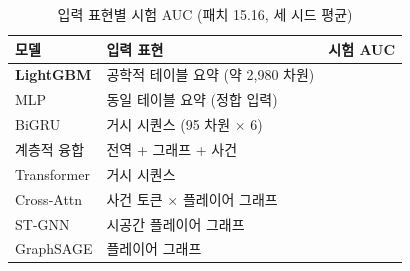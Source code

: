\begin{table}[htbp]
  \centering
  \caption{입력 표현별 시험 AUC (패치 15.16, 세 시드 평균)}
  \label{tab:baseline}
  \small
  \begin{tabular}{@{}llc@{}}
    \toprule
    모델 & 입력 표현 & 시험 AUC \\
    \midrule
    \textbf{LightGBM} & 공학적 테이블 요약 (약 2{,}980 차원) & \textbf{\aucLGBM{}} \\
    MLP & 동일 테이블 요약 (정합 입력) & \aucMLP{} \\
    BiGRU & 거시 시퀀스 (95 차원 $\times$ 6) & \aucBiGRU{} \\
    계층적 융합 & 전역 + 그래프 + 사건 & \aucLayered{} \\
    Transformer & 거시 시퀀스 & \aucTransformer{} \\
    Cross-Attn & 사건 토큰 $\times$ 플레이어 그래프 & \aucXAttn{} \\
    ST-GNN & 시공간 플레이어 그래프 & \aucSTGNN{} \\
    GraphSAGE & 플레이어 그래프 & \aucGraphSAGE{} \\
    \bottomrule
  \end{tabular}
\end{table}
